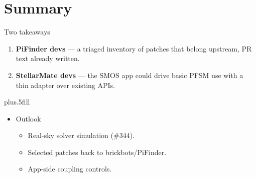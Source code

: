 \documentclass[12pt,english,aspectratio=1609]{beamer}
\newcommand{\code}[1]{{\ttfamily #1}}
\begin{document}
\section*{Summary}


\begin{frame}[t]{Two takeaways}
\begin{enumerate}
\item \textbf{PiFinder devs} — a triaged inventory of patches that belong upstream, PR text already written.
\item \textbf{StellarMate devs} — the SMOS app could drive basic PFSM use with a thin adapter over existing APIs.
\end{enumerate}
\vskip0pt plus.5fill
\begin{itemize}
\item Outlook
\begin{itemize}
\item Real-sky solver simulation (\#344).
\item Selected patches back to \code{brickbots/PiFinder}.
\item App-side coupling controls.
\end{itemize}
\end{itemize}
\end{frame}
\end{document}
